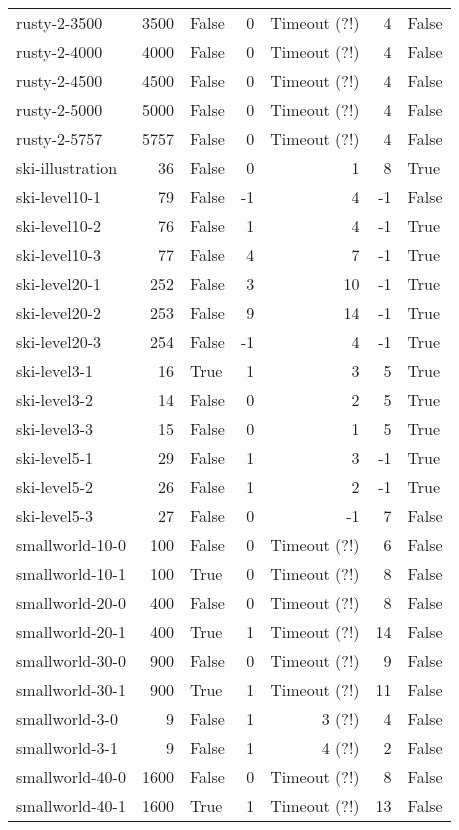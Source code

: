 \begin{longtable}{lrlrrrl}
rusty-2-3500 & 3500 & False & 0 & Timeout (?!) & 4 & False \\
rusty-2-4000 & 4000 & False & 0 & Timeout (?!) & 4 & False \\
rusty-2-4500 & 4500 & False & 0 & Timeout (?!) & 4 & False \\
rusty-2-5000 & 5000 & False & 0 & Timeout (?!) & 4 & False \\
rusty-2-5757 & 5757 & False & 0 & Timeout (?!) & 4 & False \\
ski-illustration & 36 & False & 0 & 1 & 8 & True \\
ski-level10-1 & 79 & False & -1 & 4 & -1 & False \\
ski-level10-2 & 76 & False & 1 & 4 & -1 & True \\
ski-level10-3 & 77 & False & 4 & 7 & -1 & True \\
ski-level20-1 & 252 & False & 3 & 10 & -1 & True \\
ski-level20-2 & 253 & False & 9 & 14 & -1 & True \\
ski-level20-3 & 254 & False & -1 & 4 & -1 & True \\
ski-level3-1 & 16 & True & 1 & 3 & 5 & True \\
ski-level3-2 & 14 & False & 0 & 2 & 5 & True \\
ski-level3-3 & 15 & False & 0 & 1 & 5 & True \\
ski-level5-1 & 29 & False & 1 & 3 & -1 & True \\
ski-level5-2 & 26 & False & 1 & 2 & -1 & True \\
ski-level5-3 & 27 & False & 0 & -1 & 7 & False \\
smallworld-10-0 & 100 & False & 0 & Timeout (?!) & 6 & False \\
smallworld-10-1 & 100 & True & 0 & Timeout (?!) & 8 & False \\
smallworld-20-0 & 400 & False & 0 & Timeout (?!) & 8 & False \\
smallworld-20-1 & 400 & True & 1 & Timeout (?!) & 14 & False \\
smallworld-30-0 & 900 & False & 0 & Timeout (?!) & 9 & False \\
smallworld-30-1 & 900 & True & 1 & Timeout (?!) & 11 & False \\
smallworld-3-0 & 9 & False & 1 & 3 (?!) & 4 & False \\
smallworld-3-1 & 9 & False & 1 & 4 (?!) & 2 & False \\
smallworld-40-0 & 1600 & False & 0 & Timeout (?!) & 8 & False \\
smallworld-40-1 & 1600 & True & 1 & Timeout (?!) & 13 & False \\

\end{longtable}
